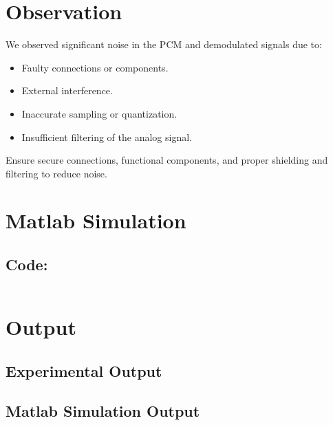 \documentclass[12pt]{article}
\begin{document}
\section*{Observation}
We observed significant noise in the PCM and demodulated signals due to:

\begin{itemize}
    \item Faulty connections or components.
    \item External interference.
    \item Inaccurate sampling or quantization.
    \item Insufficient filtering of the analog signal.
\end{itemize}

Ensure secure connections, functional components, and proper shielding and filtering to reduce noise.


\section*{Matlab Simulation}

\subsection*{Code:}

\inputminted[linenos,breaklines,breakanywhere]{matlab}{./assets/pcm.m}

\section*{Output}

\subsection*{Experimental Output}


\subsection*{Matlab Simulation Output}
% 
\end{document}
